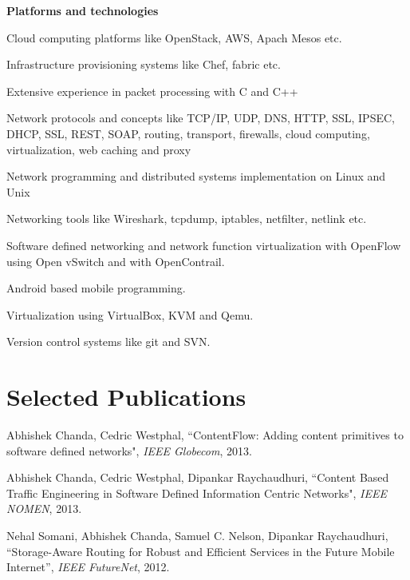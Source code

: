 \documentclass[margin,line]{resume}
\begin{document}
\begin{resume}
    \textbf{Platforms and technologies}
\begin{list2}
\item Cloud computing platforms like OpenStack, AWS, Apach Mesos etc.
\item Infrastructure provisioning systems like Chef, fabric etc.
\item Extensive experience in packet processing with C and C++
\item Network protocols and concepts like TCP/IP, UDP, DNS, HTTP, SSL, IPSEC, DHCP, SSL, REST, SOAP, routing, transport, firewalls, cloud computing, virtualization, web caching and proxy
\item Network programming and distributed systems implementation on Linux and Unix
\item Networking tools like Wireshark, tcpdump, iptables, netfilter, netlink etc.
\item Software defined networking and network function virtualization with OpenFlow using Open vSwitch and with OpenContrail.
\newpage
\item Android based mobile programming.
\item Virtualization using VirtualBox, KVM and Qemu.
\item Version control systems like git and SVN.
\end{list2}




    \section{\mysidestyle Selected Publications}

Abhishek Chanda, Cedric Westphal,
``ContentFlow: Adding content primitives to software defined networks",
\textsl{IEEE Globecom}, 2013.

\vspace{-2mm}
Abhishek Chanda, Cedric Westphal, Dipankar Raychaudhuri,
``Content Based Traffic Engineering in Software Defined Information Centric Networks",
\textsl{IEEE NOMEN}, 2013.

\vspace{-2mm}
    Nehal Somani, Abhishek Chanda, Samuel C. Nelson, Dipankar Raychaudhuri,
    ``Storage-Aware Routing for Robust and Efficient Services in the Future Mobile Internet'',
    \textsl{IEEE FutureNet}, 2012.


\end{resume}
\end{document}
